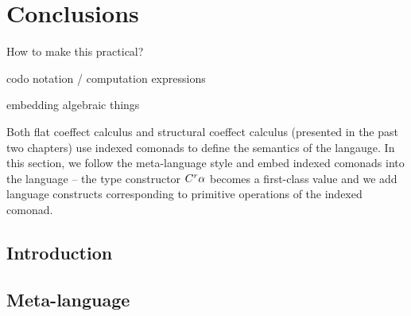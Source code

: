 
\chapter{Conclusions} 
\label{ch:conclusions} 


How to make this practical?

codo notation / computation expressions

embedding algebraic things



Both flat coeffect calculus and structural coeffect calculus (presented in the past two chapters)
use indexed comonads to define the semantics of the langauge. In this section, we follow the 
meta-language style and embed indexed comonads into the language -- the type constructor
$C^{r}\alpha$ becomes a first-class value and we add language constructs corresponding to
primitive operations of the indexed comonad.


\newcommand{\munit}{\mathsf{e}}
\newcommand{\mseq}[0]{ \oplus }


\section{Introduction}

\section{Meta-language}
\label{sec:conclusions-meta} 

